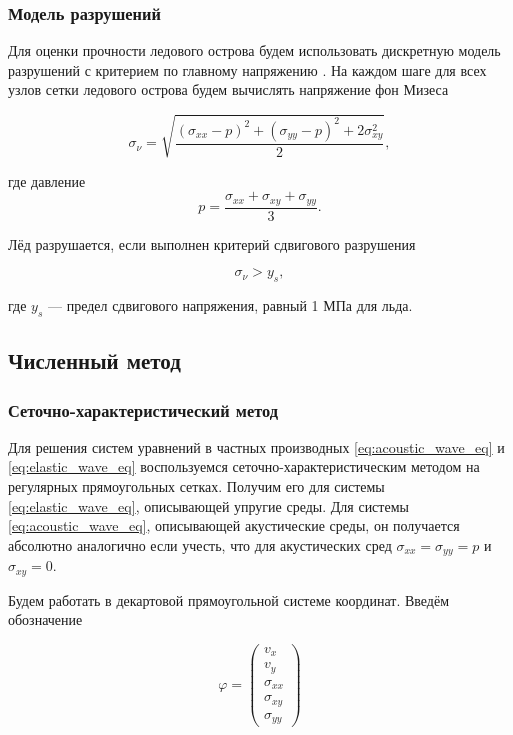 \subsubsection{Модель разрушений}

Для оценки прочности ледового острова будем использовать дискретную модель разрушений с критерием по главному напряжению \cite{grigoriev}. На каждом шаге для всех узлов сетки ледового острова будем вычислять напряжение фон Мизеса

\begin{equation*}
    \sigma_\nu = \sqrt{\dfrac{\left(\sigma_{xx} - p\right)^2 + \left(\sigma_{yy} - p\right)^2 + 2\sigma_{xy}^2}{2}} ,
\end{equation*}

\noindent где давление 
\begin{equation*}
    p=\frac{\sigma_{xx}+\sigma_{xy}+\sigma_{yy}}{3} .
\end{equation*}

\noindent Лёд разрушается, если выполнен критерий сдвигового разрушения

\begin{equation*}
    \sigma_\nu > y_s ,
\end{equation*}

\noindent где $y_s$ --- предел сдвигового напряжения, равный 1 МПа для льда.

\subsection{Численный метод}

\subsubsection{Сеточно-характеристический метод}
\label{sec:elastic_gcm}

Для решения систем уравнений в частных производных \eqref{eq:acoustic_wave_eq} и \eqref{eq:elastic_wave_eq}  воспользуемся сеточ\-но-характеристическим методом на регулярных прямоугольных сетках. Получим его для системы \eqref{eq:elastic_wave_eq}, описывающей упругие среды. Для системы \eqref{eq:acoustic_wave_eq}, описывающей акустические среды, он получается абсолютно аналогично если учесть, что для акустических сред $\sigma_{xx} = \sigma_{yy} = p$ и $\sigma_{xy}=0$.

Будем работать в декартовой прямоугольной системе координат. Введём обозначение

\begin{equation*}
    \varphi = \begin{pmatrix} v_x \\ v_y \\ \sigma_{xx} \\ \sigma_{xy} \\ \sigma_{yy} \end{pmatrix}
\end{equation*}

